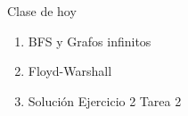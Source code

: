 \begin{frame}{Clase de hoy}
	\begin{enumerate}
		\item BFS y Grafos infinitos
		\item Floyd-Warshall
		\item Solución Ejercicio 2 Tarea 2
	\end{enumerate}
\end{frame}
